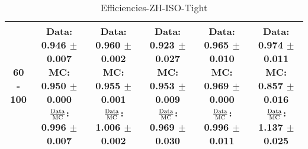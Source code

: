 \documentclass[final,letterpaper,twoside,12pt]{article}
\begin{document}
\begin{table}[htbp]
\begin{adjustwidth}{-4em}{-4em}
\begin{tabular}{|c|c|c|c|c|c|}
60 - 100 & \parbox[c]{1.1 in}{ \scriptsize  Data: 0.946 $\pm$ 0.007 \newline MC: 0.950 $\pm$ 0.000 \newline $\frac{\rm{Data}}{\rm{MC}}$: 0.996 $\pm$ 0.007} & \parbox[c]{1.1 in}{ \scriptsize  Data: 0.960 $\pm$ 0.002 \newline MC: 0.955 $\pm$ 0.001 \newline $\frac{\rm{Data}}{\rm{MC}}$: 1.006 $\pm$ 0.002} & \parbox[c]{1.1 in}{ \scriptsize  Data: 0.923 $\pm$ 0.027 \newline MC: 0.953 $\pm$ 0.009 \newline $\frac{\rm{Data}}{\rm{MC}}$: 0.969 $\pm$ 0.030} & \parbox[c]{1.1 in}{ \scriptsize  Data: 0.965 $\pm$ 0.010 \newline MC: 0.969 $\pm$ 0.000 \newline $\frac{\rm{Data}}{\rm{MC}}$: 0.996 $\pm$ 0.011} & \parbox[c]{1.1 in}{ \scriptsize  Data: 0.974 $\pm$ 0.011 \newline MC: 0.857 $\pm$ 0.016 \newline $\frac{\rm{Data}}{\rm{MC}}$: 1.137 $\pm$ 0.025}\\ \hline 
\end{tabular}
\caption {Efficiencies-ZH-ISO-Tight}
\label{tab:cqdata0}
\end{adjustwidth}\end{table}
\end{document}
